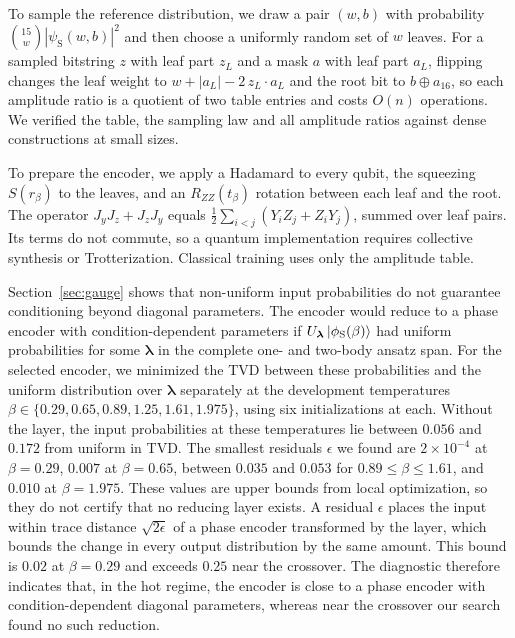 \documentclass[pra,aps,10pt,twocolumn,floatfix,superscriptaddress, notitlepage,longbibliography]{revtex4-2}
\begin{document}
To sample the reference distribution, we draw a pair $(w,b)$ with probability $\binom{15}{w}|\psi_{\mathrm S}(w,b)|^2$ and then choose a uniformly random set of $w$ leaves. For a sampled bitstring $z$ with leaf part $z_L$ and a mask $a$ with leaf part $a_L$, flipping changes the leaf weight to $w+|a_L|-2\,z_L\cdot a_L$ and the root bit to $b\oplus a_{16}$, so each amplitude ratio is a quotient of two table entries and costs $O(n)$ operations. We verified the table, the sampling law and all amplitude ratios against dense constructions at small sizes.

To prepare the encoder, we apply a Hadamard to every qubit, the squeezing $S(r_\beta)$ to the leaves, and an $R_{ZZ}(t_\beta)$ rotation between each leaf and the root. The operator $J_yJ_z+J_zJ_y$ equals $\tfrac{1}{2}\sum_{i<j}(Y_iZ_j+Z_iY_j)$, summed over leaf pairs. Its terms do not commute, so a quantum implementation requires collective synthesis or Trotterization. Classical training uses only the amplitude table.

Section~\ref{sec:gauge} shows that non-uniform input probabilities do not guarantee conditioning beyond diagonal parameters. The encoder would reduce to a phase encoder with condition-dependent parameters if $U_{\boldsymbol\lambda}\ket{\phi_{\mathrm S}(\beta)}$ had uniform probabilities for some $\boldsymbol\lambda$ in the complete one- and two-body ansatz span. For the selected encoder, we minimized the TVD between these probabilities and the uniform distribution over $\boldsymbol\lambda$ separately at the development temperatures $\beta\in\{0.29,0.65,0.89,1.25,1.61,1.975\}$, using six initializations at each. Without the layer, the input probabilities at these temperatures lie between $0.056$ and $0.172$ from uniform in TVD. The smallest residuals $\epsilon$ we found are $2\times10^{-4}$ at $\beta=0.29$, $0.007$ at $\beta=0.65$, between $0.035$ and $0.053$ for $0.89\leq\beta\leq1.61$, and $0.010$ at $\beta=1.975$. These values are upper bounds from local optimization, so they do not certify that no reducing layer exists. A residual $\epsilon$ places the input within trace distance $\sqrt{2\epsilon}$ of a phase encoder transformed by the layer, which bounds the change in every output distribution by the same amount. This bound is $0.02$ at $\beta=0.29$ and exceeds $0.25$ near the crossover. The diagnostic therefore indicates that, in the hot regime, the encoder is close to a phase encoder with condition-dependent diagonal parameters, whereas near the crossover our search found no such reduction.
\end{document}
